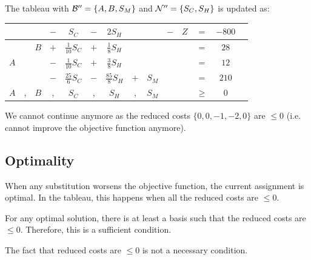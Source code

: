 \begin{example}
\begin{enumerate}
            The tableau with $\mathcal{B}'' = \{ A, B, S_M \}$ and $\mathcal{N}'' = \{ S_C, S_H \}$ is updated as:
            \begin{center}
                \begin{tabular}{cccccccccccccc}
                    \toprule
                     & & & $-$ & $S_C$ & $-$ & $2S_H$ & & & $-$ & $Z$ & $=$ & $-800$ \\
                    \midrule
                    & & $B$ & $+$ & $\frac{1}{10}S_C$ & $+$ & $\frac{1}{8}S_H$ & & & & & $=$ & $28$ \\
                    $A$ & & & $-$ & $\frac{1}{10}S_C$ & $+$ & $\frac{3}{8}S_H$ & & & & & $=$ & $12$ \\
                    & & & $-$ & $\frac{25}{6}S_C$ & $-$ & $\frac{85}{8}S_H$ & $+$ & $S_M$ & & & $=$ & $210$ \\
                    \midrule
                    $A$ & , & $B$ & , & $S_C$ & , & $S_H$ & , & $S_M$ & & & $\geq$ & 0 \\
                    \bottomrule
                \end{tabular}
            \end{center}

            We cannot continue anymore as the reduced costs $\{ 0, 0, -1, -2, 0 \}$ are $\leq 0$ (i.e. cannot improve the objective function anymore).
    \end{enumerate}
\end{example}


\subsection{Optimality}

When any substitution worsens the objective function, the current assignment is optimal.
In the tableau, this happens when all the reduced costs are $\leq 0$.

\begin{remark}
    For any optimal solution, there is at least a basis such that the reduced costs are $\leq 0$.
    Therefore, this is a sufficient condition.
\end{remark}

\begin{remark}
    The fact that reduced costs are $\leq 0$ is not a necessary condition.
\end{remark}

